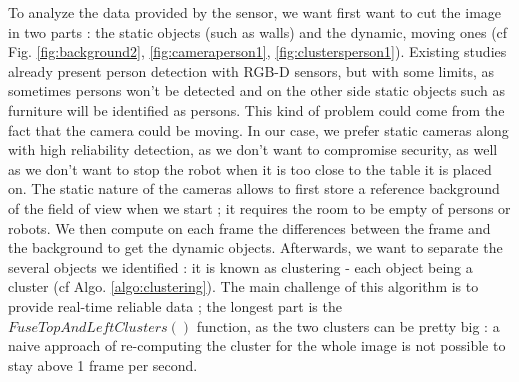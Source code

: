 \documentclass[smallextended]{svjour3}
\begin{document}
To analyze the data provided by the sensor, we want first want to cut the image in two parts : the static objects (such as walls) and the dynamic, moving ones (cf Fig. \ref{fig:background2}, \ref{fig:cameraperson1}, \ref{fig:clustersperson1}). Existing studies already present person detection with RGB-D sensors, but with some limits, as sometimes persons won't be detected and on the other side static objects such as furniture will be identified as persons. This kind of problem could come from the fact that the camera could be moving.
In our case, we prefer static cameras along with high reliability detection, as we don't want to compromise security, as well as we don't want to stop the robot when it is too close to the table it is placed on. The static nature of the cameras allows to first store a reference background of the field of view when we start ; it requires the room to be empty of persons or robots. We then compute on each frame the differences between the frame and the background to get the dynamic objects. Afterwards, we want to separate the several objects we identified : it is known as clustering - each object being a cluster (cf Algo. \ref{algo:clustering}). The main challenge of this algorithm is to provide real-time reliable data ; the longest part is the $FuseTopAndLeftClusters()$ function, as the two clusters can be pretty big : a naive approach of re-computing the cluster for the whole image is not possible to stay above 1 frame per second.
\end{document}
